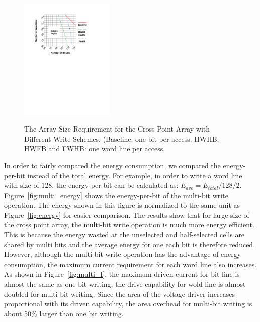 \begin{figure}%
\centering
  \includegraphics[width=0.4\textwidth]{./figures/multiwrite.pdf}\\
  \caption{The Array Size Requirement for the Cross-Point Array with Different Write Schemes. (Baseline: one bit per access. HWHB, HWFB and FWHB: one word line per access. }\label{fig:reliable_region}
\end{figure}

In order to fairly compared the energy consumption, we compared the energy-per-bit instead of the total energy. For example, in order to write a word line with size of 128, the energy-per-bit can be calculated as:
$E_{ave}=E_{total}/128/2$. Figure~\ref{fig:multi_energy} shows the energy-per-bit of the multi-bit write operation. The energy shown in this figure is normalized to the same unit as Figure~\ref{fig:energy} for easier comparison. The results show that for large size of the cross point array, the multi-bit write operation is much more energy efficient. This is because the energy wasted at the unselected and half-selected cells are shared by multi bits and the average energy for one each bit is therefore reduced. However, although the multi bit write operation has the advantage of energy consumption, the maximum current requirement for each word line also increases. As shown in Figure~\ref{fig:multi_I}, the maximum driven current for bit line is almost the same as one bit writing, the drive capability for wold line is almost doubled for multi-bit writing. Since the area of the voltage driver increases proportional with its driven capability, the area overhead for multi-bit writing is about 50\% larger than one bit writing.


